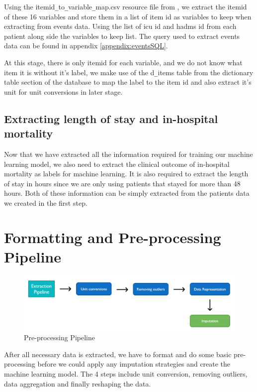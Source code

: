 \documentclass{l4proj}
\begin{document}
Using the itemid\verb|_|to\verb|_|variable\verb|_|map.csv resource file from \cite{MIMIC_Extract_Github}, we extract the itemid of these 16 variables and store them in a list of item id as variables to keep when extracting from events data. Using the list of icu id and hadms id from each patient along side the variables to keep list. The query used to extract events data can be found in appendix \ref{appendix:eventsSQL}.


At this stage, there is only itemid for each variable, and we do not know what item it is without it's label, we make use of the d\verb|_|items table from the dictionary table section of the database to map the label to the item id and also extract it's unit for unit conversions in later stage. 


\subsection{Extracting length of stay and in-hospital mortality}
Now that we have extracted all the information required for training our machine learning model, we also need to extract the clinical outcome of in-hospital mortality as labels for machine learning. It is also required to extract the length of stay in hours since we are only using patients that stayed for more than 48 hours. Both of these information can be simply extracted from the patients data we created in the first step.


\section{Formatting and Pre-processing Pipeline}


\begin{figure}[h!]
  \caption{Pre-processing Pipeline}
  \includegraphics[width=\textwidth]{dissertation/Latex/images/Preprecessing pipeline.PNG}
\end{figure}


After all necessary data is extracted, we have to format and do some basic pre-processing before we could apply any imputation strategies and create the machine learning model. The 4 steps include unit conversion, removing outliers, data aggregation and finally reshaping the data.
\end{document}
